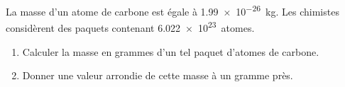 
\begin{exercice}\label{exo2smath-0209}

    La masse d’un atome de carbone est égale à \SI[parse-numbers=true]{1.99e-26 }{\kilo\gram}. Les chimistes considèrent des paquets contenant \SI[parse-numbers=true]{6.022e23} atomes. 
    \begin{enumerate}
        \item
            Calculer la masse en grammes d’un tel paquet d’atomes de carbone. 
        \item
            Donner une valeur arrondie de cette masse à un gramme près.
    \end{enumerate}

\end{exercice}
